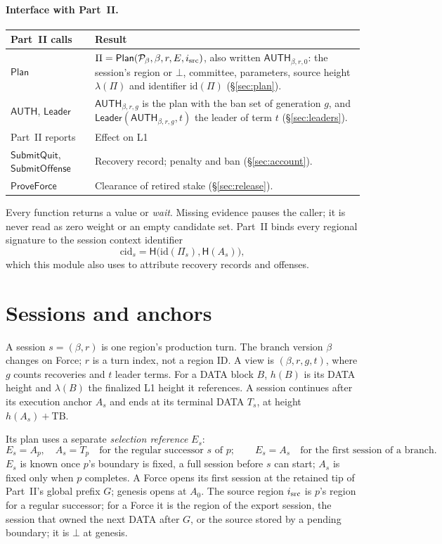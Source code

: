 \documentclass[11pt,a4paper]{article}
\newcommand{\Hash}{\mathsf H}
\newcommand{\tagg}[1]{\mathsf{#1}}
\newcommand{\cid}{\mathrm{cid}}
\begin{document}
\paragraph{Interface with Part~II.}\leavevmode\par
\begin{tabularx}{\linewidth}{@{}>{\raggedright\arraybackslash}p{.22\linewidth}Y@{}}\toprule
Part~II calls & Result\\\midrule
$\tagg{Plan}$ & $\Pi=\tagg{Plan}(\mathcal P_\beta,\beta,r,E,i_{\rm src})$,
also written $\tagg{AUTH}_{\beta,r,0}$: the session's region or $\bot$,
committee, parameters, source height $\lambda(\Pi)$ and identifier
$\mathrm{id}(\Pi)$ (\S\ref{sec:plan}).\\
$\tagg{AUTH}$, $\tagg{Leader}$ & $\tagg{AUTH}_{\beta,r,g}$ is the plan with the
ban set of generation $g$, and $\tagg{Leader}(\tagg{AUTH}_{\beta,r,g},t)$ the
leader of term $t$ (\S\ref{sec:leaders}).\\\midrule
Part~II reports & Effect on L1\\\midrule
$\tagg{SubmitQuit}$, $\tagg{SubmitOffense}$ & Recovery record; penalty and
ban (\S\ref{sec:account}).\\
$\tagg{ProveForce}$ & Clearance of retired stake (\S\ref{sec:release}).\\\bottomrule
\end{tabularx}

Every function returns a value or \emph{wait}. Missing evidence pauses
the caller; it is never read as zero weight or an empty candidate set.
Part~II binds every regional signature to the session context identifier
\[
 \cid_s=\Hash\bigl(\mathrm{id}(\Pi_s),\Hash(A_s)\bigr),
\]
which this module also uses to attribute recovery records and offenses.

\section{Sessions and anchors}
\label{sec:anchors}
A session $s=(\beta,r)$ is one region's production turn. The branch
version $\beta$ changes on Force; $r$ is a turn index, not a region ID. A
view is $(\beta,r,g,t)$, where $g$ counts recoveries and $t$ leader terms.
For a DATA block $B$, $h(B)$ is its DATA height and $\lambda(B)$ the
finalized L1 height it references. A session continues after its
execution anchor $A_s$ and ends at its terminal DATA $T_s$, at height
$h(A_s)+\mathrm{TB}$.

Its plan uses a separate \emph{selection reference} $E_s$:
\[
 E_s=A_p,\quad A_s=T_p\quad\text{for the regular successor $s$ of $p$};
 \qquad E_s=A_s\quad\text{for the first session of a branch.}
\]
$E_s$ is known once $p$'s boundary is fixed, a full session before $s$
can start; $A_s$ is fixed only when $p$ completes. A Force opens its
first session at the retained tip of Part~II's global prefix $G$; genesis
opens at $A_0$. The source region $i_{\rm src}$ is $p$'s region for a
regular successor; for a Force it is the region of the export session,
the session that owned the next DATA after $G$, or the source stored by a
pending boundary; it is $\bot$ at genesis.
\end{document}
